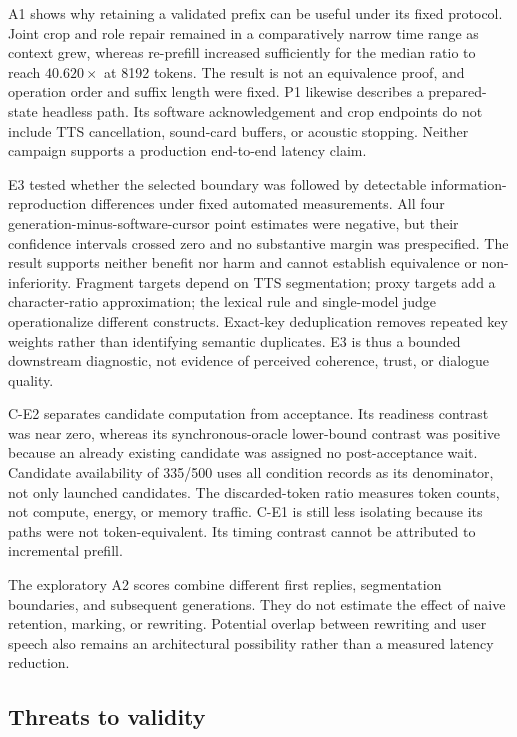 A1 shows why retaining a validated prefix can be useful under its fixed protocol. Joint crop and role repair remained in a comparatively narrow time range as context grew, whereas re-prefill increased sufficiently for the median ratio to reach $40.620\times$ at 8192 tokens. The result is not an equivalence proof, and operation order and suffix length were fixed. P1 likewise describes a prepared-state headless path. Its software acknowledgement and crop endpoints do not include TTS cancellation, sound-card buffers, or acoustic stopping. Neither campaign supports a production end-to-end latency claim.

E3 tested whether the selected boundary was followed by detectable information-reproduction differences under fixed automated measurements. All four generation-minus-software-cursor point estimates were negative, but their confidence intervals crossed zero and no substantive margin was prespecified. The result supports neither benefit nor harm and cannot establish equivalence or non-inferiority. Fragment targets depend on TTS segmentation; proxy targets add a character-ratio approximation; the lexical rule and single-model judge operationalize different constructs. Exact-key deduplication removes repeated key weights rather than identifying semantic duplicates. E3 is thus a bounded downstream diagnostic, not evidence of perceived coherence, trust, or dialogue quality.

C-E2 separates candidate computation from acceptance. Its readiness contrast was near zero, whereas its synchronous-oracle lower-bound contrast was positive because an already existing candidate was assigned no post-acceptance wait. Candidate availability of 335/500 uses all condition records as its denominator, not only launched candidates. The discarded-token ratio measures token counts, not compute, energy, or memory traffic. C-E1 is still less isolating because its paths were not token-equivalent. Its timing contrast cannot be attributed to incremental prefill.

The exploratory A2 scores combine different first replies, segmentation boundaries, and subsequent generations. They do not estimate the effect of naive retention, marking, or rewriting. Potential overlap between rewriting and user speech also remains an architectural possibility rather than a measured latency reduction.

\subsection{Threats to validity}

